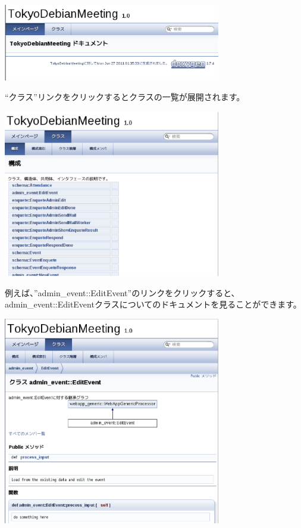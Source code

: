 \documentclass[mingoth,a4paper]{jsarticle}
\begin{document}
\begin{center}
\includegraphics[width=9.5cm]{image201106/doxygen0.eps}
\end{center}

``クラス''リンクをクリックするとクラスの一覧が展開されます。
\begin{center}
\includegraphics[width=9.5cm]{image201106/doxygen1.eps}
\end{center}

例えば、''admin\_event::EditEvent''のリンクをクリックすると、admin\_event::EditEventクラスについてのドキュメントを見ることができます。
\begin{center}
\includegraphics[width=9.5cm]{image201106/doxygen2.eps}
\end{center}
\end{document}
